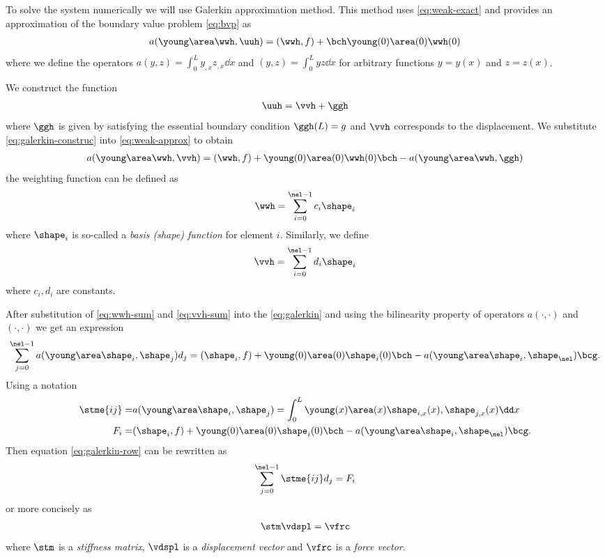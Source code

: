 \documentclass[twoside,a4paper,12pt]{article}
\begin{document}
To solve the system numerically we will use Galerkin approximation
method. This method uses \eqref{eq:weak-exact} and provides an
approximation of the boundary value problem \eqref{eq:bvp} as
%
\begin{align}
a(\young\area\wwh,\uuh) = (\wwh,f) + \bch \young(0)\area(0)\wwh(0) \label{eq:weak-approx}
\end{align}
%
where we define the operators $a(y,z) = \int_0^L y_{,x} z_{,x} \dd x$
and $(y,z) = \int_0^L y z \dd x$ for arbitrary functions $y = y(x)$
and $z= z(x)$.

We construct the function
\begin{align}
  \uuh  = \vvh + \ggh \label{eq:galerkin-construc}
\end{align}
%
where $\ggh$ is given by satisfying the essential boundary condition
$\ggh(L) = g$ and $\vvh$ corresponds to the displacement. We
substitute \eqref{eq:galerkin-construc} into \eqref{eq:weak-approx} to
obtain
%
\begin{align}
  a(\young\area\wwh,\vvh) = (\wwh, f) + \young(0)\area(0)\wwh(0)\bch - 
  a(\young\area\wwh,\ggh)\label{eq:galerkin}
\end{align}
%
the weighting function can be defined as
%
\begin{align}
  \wwh = \sum_{i=0}^{\nel-1} c_i \shape_i \label{eq:wwh-sum}
\end{align}
%
where $\shape_i$ is so-called a \emph{basis (shape) function} for
element $i$. Similarly, we define
%
\begin{align}
  \vvh = \sum_{i=0}^{\nel-1} d_i \shape_i \label{eq:vvh-sum}
\end{align}
where $c_i, d_i$ are constants.

After substitution of \eqref{eq:wwh-sum} and \eqref{eq:vvh-sum} into
the \eqref{eq:galerkin} and using the bilinearity property of
operators $a(\cdot,\cdot)$ and $(\cdot,\cdot)$ we get an expression
%
\begin{align}
  \sum_{j=0}^{\nel-1} a(\young\area\shape_i, \shape_j) d_j = (\shape_i, f) + \young(0)\area(0)\shape_i(0) \bch - a(\young\area\shape_i,\shape_\nel)\bcg. \label{eq:galerkin-row}
\end{align}
%
Using a notation
%
\begin{subequations}
  \begin{align}
    \stme{ij} =& a(\young\area\shape_i,\shape_j) = \int_0^L \young(x)\area(x)\shape_{i,x}(x),\shape_{j,x}(x) \dd x \label{eq:stme} \\ 
    F_i =& (\shape_i,f) + \young(0)\area(0)\shape_i(0) \bch - a(\young\area\shape_i,\shape_{\nel}) \bcg .
  \end{align}\label{eq:fem-stme-fi}
\end{subequations}
%
Then equation \eqref{eq:galerkin-row} can be rewritten as
%
\begin{align}
  \sum_{j=0}^{\nel-1} \stme{ij} d_j = F_i
\end{align}
or more concisely as
\begin{align}
\stm \vdspl = \vfrc \label{eq:concise-eq}
\end{align}
where $\stm$ is a \emph{stiffness matrix}, $\vdspl$ is a
\emph{displacement vector} and $\vfrc$ is a \emph{force vector}.
\end{document}
